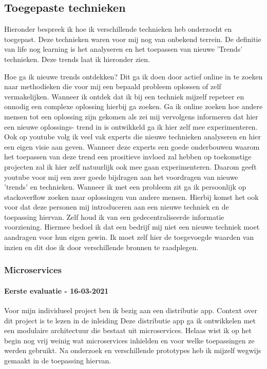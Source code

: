 \subsection{Toegepaste technieken}\label{subsec:toegepaste-technieken}
Hieronder bespreek ik hoe ik verschillende technieken heb onderzocht en toegepast.
Deze technieken waren voor mij nog van onbekend terrein.
De definitie van life nog learning is het analyseren en het toepassen van nieuwe 'Trends' technieken.
Deze trends laat ik hieronder zien.

Hoe ga ik nieuwe trends ontdekken?
Dit ga ik doen door actief online in te zoeken naar methodieken die voor mij een bepaald probleem oplossen of zelf
vermakelijken.
Wanneer ik ontdek dat ik bij een techniek mijzelf repeteer en onnodig een complexe oplossing hierbij ga zoeken.
Ga ik online zoeken hoe andere mensen tot een oplossing zijn gekomen als zei mij vervolgens informeren dat hier een
nieuwe oplossings- trend in is ontwikkeld ga ik hier zelf mee experimenteren.
Ook op youtube volg ik veel vak experts die nieuwe technieken analyseren en hier een eigen visie aan geven.
Wanneer deze experts een goede onderbouwen waarom het toepassen van deze trend een prositieve invloed zal hebben op
toekomstige projecten zal ik hier zelf natuurlijk ook mee gaan experimenteren.
Daarom geeft youtube voor mij een zeer goede bijdragen aan het voordragen van nieuwe 'trends' en technieken.
Wanneer ik met een probleem zit ga ik persoonlijk op stackoverflow zoeken naar oplossingen van andere mensen.
Hierbij komst het ook voor dat deze personen mij introduceren aan een nieuwe techniek en de toepassing hiervan.
Zelf houd ik van een gedecentraliseerde informatie voorziening.
Hiermee bedoel ik dat een bedrijf mij niet een nieuwe techniek moet aandragen voor hun eigen gewin.
Ik moet zelf hier de toegevoegde waarden van inzien en dit doe ik door verschillende bronnen te raadplegen.


\subsubsection{Microservices}
\paragraph{Eerste evaluatie - 16-03-2021}
Voor mijn individueel project ben ik bezig aan een distributie app.
Context over dit project is te lezen in de inleiding
Deze distributie app ga ik ontwikkelen met een modulaire architectuur die bestaat uit microservices.
Helaas wist ik op het begin nog vrij weinig wat microservices inhielden en voor welke toepassingen ze werden gebruikt.
Na onderzoek en verschillende prototypes heb ik mijzelf wegwijs gemaakt in de toepassing hiervan.

